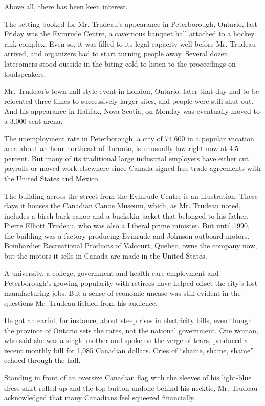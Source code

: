 Above all, there has been keen interest.

The setting booked for Mr. Trudeau's appearance in Peterborough,
Ontario, last Friday was the Evinrude Centre, a cavernous banquet hall
attached to a hockey rink complex. Even so, it was filled to its legal
capacity well before Mr. Trudeau arrived, and organizers had to start
turning people away. Several dozen latecomers stood outside in the
biting cold to listen to the proceedings on loudspeakers.

Mr. Trudeau's town-hall-style event in London, Ontario, later that day
had to be relocated three times to successively larger sites, and people
were still shut out. And his appearance in Halifax, Nova Scotia, on
Monday was eventually moved to a 3,000-seat arena.

The unemployment rate in Peterborough, a city of 74,600 in a popular
vacation area about an hour northeast of Toronto, is unusually low right
now at 4.5 percent. But many of its traditional large industrial
employers have either cut payrolls or moved work elsewhere since Canada
signed free trade agreements with the United States and Mexico.

The building across the street from the Evinrude Centre is an
illustration. These days it houses the
\href{http://www.canoemuseum.ca}{Canadian Canoe Museum,} which, as Mr.
Trudeau noted, includes a birch bark canoe and a buckskin jacket that
belonged to his father, Pierre Elliott Trudeau, who was also a Liberal
prime minister. But until 1990, the building was a factory producing
Evinrude and Johnson outboard motors. Bombardier Recreational Products
of Valcourt, Quebec, owns the company now, but the motors it sells in
Canada are made in the United States.

A university, a college, government and health care employment and
Peterborough's growing popularity with retirees have helped offset the
city's lost manufacturing jobs. But a sense of economic unease was still
evident in the questions Mr. Trudeau fielded from his audience.

He got an earful, for instance, about steep rises in electricity bills,
even though the province of Ontario sets the rates, not the national
government. One woman, who said she was a single mother and spoke on the
verge of tears, produced a recent monthly bill for 1,085 Canadian
dollars. Cries of ``shame, shame, shame'' echoed through the hall.

Standing in front of an oversize Canadian flag with the sleeves of his
light-blue dress shirt rolled up and the top button undone behind his
necktie, Mr. Trudeau acknowledged that many Canadians feel squeezed
financially.

